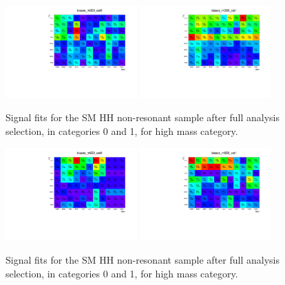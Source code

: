 \begin{figure}[thb]
  \centering
  \includegraphics[width=0.45\textwidth]{figures/sec-bias/biases_m300_cat0.pdf}\hfil
  \includegraphics[width=0.45\textwidth]{figures/sec-bias/biases_m300_cat1.pdf}\hfil
  \caption{Signal fits for the SM HH non-resonant sample after full analysis selection, in categories 0 and 1, for high mass category.}
  \label{fig:bkg_bias3}
\end{figure}
\begin{figure}[thb]
  \centering
  \includegraphics[width=0.45\textwidth]{figures/sec-bias/biases_m650_cat0.pdf}\hfil
  \includegraphics[width=0.45\textwidth]{figures/sec-bias/biases_m650_cat1.pdf}\hfil
  \caption{Signal fits for the SM HH non-resonant sample after full analysis selection, in categories 0 and 1, for high mass category.}
  \label{fig:bkg_bias4}
\end{figure}

